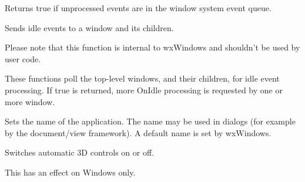 \label{wxapppending}


Returns true if unprocessed events are in the window system event queue.




\label{wxappsendidleevents}


Sends idle events to a window and its children.

Please note that this function is internal to wxWindows and shouldn't be used
by user code.


These functions poll the top-level windows, and their children, for idle event processing.
If true is returned, more OnIdle processing is requested by one or more window.




\label{wxappsetappname}


Sets the name of the application. The name may be used in dialogs
(for example by the document/view framework). A default name is set by
wxWindows.




\label{wxappsetauto3d}


Switches automatic 3D controls on or off.




This has an effect on Windows only.




